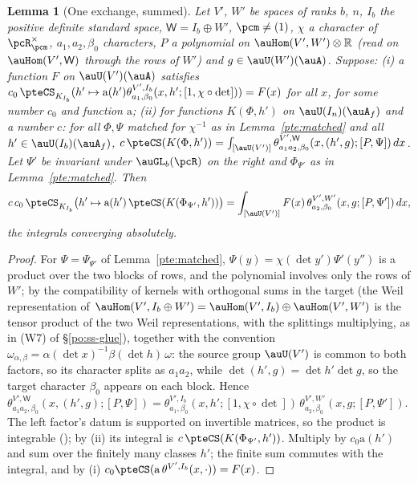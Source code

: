 \documentclass[10pt]{amsart}
\newtheorem{lemma}[theorem]{Lemma}
\theoremstyle{definition}
\theoremstyle{remark}
\newcommand{\R}{\mathbb R}
\begin{document}
\begin{lemma}[One exchange, summed]\label{pte:one}
Let $V'$, $W'$ be spaces of ranks $b$, $n$, $I_b$ the positive definite standard space, $\mathsf W=
I_b\oplus W'$, $\pcm\ne(1)$, $\chi$ a character of $\pcR_\pcm^\times$, $a_1,a_2,\beta_0$ characters, $P$ a
polynomial on $\auHom(V',W')\otimes\R$ (read on $\auHom(V',\mathsf W)$ through the rows of $W'$) and
$g\in\auU(W')(\auA)$. Suppose: (i) a function $F$ on $\auU(V')(\auA)$ satisfies $c_0\,\pteCS_{K_{I_b}}
(h'\mapsto\mathrm a(h')\theta^{V',I_b}_{a_1,\beta_0}(x,h';[1,\chi\circ\det]))=F(x)$ for all $x$, for some
number $c_0$ and function $\mathrm a$; (ii) for functions $K(\Phi,h')$ on $\auU(I_n)(\auA_f)$ and a
number $c$: for all $\Phi,\Psi$ matched for $\chi^{-1}$ as in Lemma~\ref{pte:matched} and all
$h'\in\auU(I_b)(\auA_f)$, $c\,\pteCS(K(\Phi,h'))=\int_{[\auU(V')]}\theta^{V',\mathsf W}_{a_1a_2,\beta_0}(x,
(h',g);[P,\Psi])\,dx$. Let $\Psi'$ be invariant under $\auGL_b(\pcR)$ on the right and $\Phi_{\Psi'}$ as
in Lemma~\ref{pte:matched}. Then
\[
c\,c_0\,\pteCS_{K_{I_b}}\bigl(h'\mapsto\mathrm a(h')\,\pteCS(K(\Phi_{\Psi'},h'))\bigr)=\int_{[\auU(V')]}
F(x)\,\theta^{V',W'}_{a_2,\beta_0}(x,g;[P,\Psi'])\,dx,
\]
the integrals converging absolutely.
\end{lemma}
\begin{proof}
For $\Psi=\Psi_{\Psi'}$ of Lemma~\ref{pte:matched}, $\Psi(y)=\chi(\det y')\Psi'(y'')$ is a product over
the two blocks of rows, and the polynomial involves only the rows of $W'$; by the compatibility of
kernels with orthogonal sums in the target (the Weil representation of $\auHom(V',I_b\oplus W')=
\auHom(V',I_b)\oplus\auHom(V',W')$ is the tensor product of the two Weil representations, with the
splittings multiplying, as in (W7) of \S\ref{po:ss-glue}), together with the convention
$\omega_{\alpha,\beta}=\alpha(\det x)^{-1}\beta(\det h)\,\omega$: the source group $\auU(V')$ is common to
both factors, so its character splits as $a_1a_2$, while $\det(h',g)=\det h'\det g$, so the target character $\beta_0$
appears on each block. Hence $\theta^{V',\mathsf W}_{a_1a_2,\beta_0}(x,(h',g);[P,\Psi])=
\theta^{V',I_b}_{a_1,\beta_0}(x,h';[1,\chi\circ\det])\,\theta^{V',W'}_{a_2,\beta_0}(x,g;[P,\Psi'])$. The left
factor's datum is supported on invertible matrices, so the product is integrable
({\cite[Corollary~3.34]{P53}}); by (ii) its integral is $c\,\pteCS(K(\Phi_{\Psi'},h'))$. Multiply by
$c_0\mathrm a(h')$ and sum over the finitely many classes $h'$; the finite sum commutes with the
integral, and by (i) $c_0\pteCS(\mathrm a\,\theta^{V',I_b}(x,\cdot))=F(x)$.
\end{proof}
\end{document}
